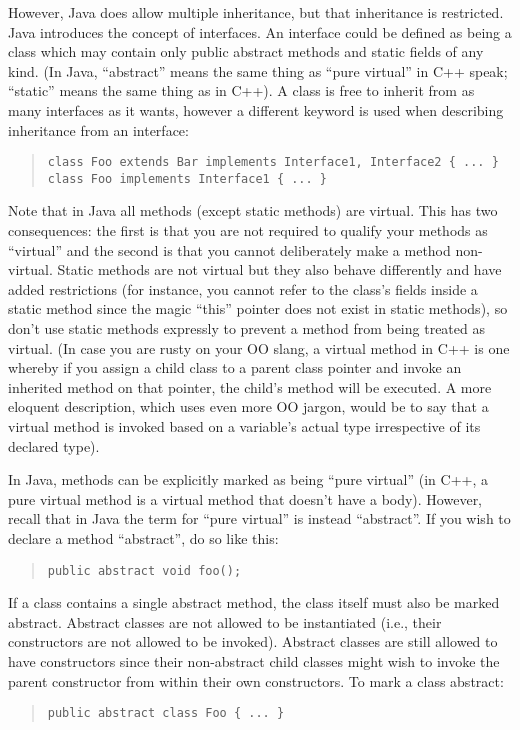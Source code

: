 \documentclass[12pt]{article}
\begin{document}
However, Java does allow multiple inheritance, but that inheritance is
restricted.  Java introduces the concept of interfaces.  An interface
could be defined as being a class which may contain only public
abstract methods and static fields of any kind.  (In Java,
``abstract'' means the same thing as ``pure virtual'' in C++ speak;
``static'' means the same thing as in C++).  A class is free to
inherit from as many interfaces as it wants, however a different
keyword is used when describing inheritance from an interface:
\begin{quote}
\begin{verbatim}
class Foo extends Bar implements Interface1, Interface2 { ... }
class Foo implements Interface1 { ... }
\end{verbatim}
\end{quote}

Note that in Java all methods (except static methods) are virtual.  This
has two consequences: the first is that you are not required to qualify
your methods as ``virtual'' and the second is that you cannot deliberately
make a method non-virtual.  Static methods are not virtual but they also
behave differently and have added restrictions (for instance, you cannot
refer to the class's fields inside a static method since the magic ``this''
pointer does not exist in static methods), so don't use static methods
expressly to prevent a method from being treated as virtual.  (In case you
are rusty on your OO slang, a virtual method in C++ is one whereby if you
assign a child class to a parent class pointer and invoke an inherited
method on that pointer, the child's method will be executed.  A more
eloquent description, which uses even more OO jargon, would be to say that
a virtual method is invoked based on a variable's actual type irrespective
of its declared type).

In Java, methods can be explicitly marked as being ``pure virtual'' (in C++,
a pure virtual method is a virtual method that doesn't have a body).
However, recall that in Java the term for ``pure virtual'' is instead
``abstract''.  If you wish to declare a method ``abstract'', do so like this:
\begin{quote}
\begin{verbatim}
public abstract void foo();
\end{verbatim}
\end{quote}

If a class contains a single abstract method, the class itself must also be
marked abstract.  Abstract classes are not allowed to be instantiated
(i.e., their constructors are not allowed to be invoked).  Abstract classes
are still allowed to have constructors since their non-abstract child
classes might wish to invoke the parent constructor from within their own
constructors.  To mark a class abstract:
\begin{quote}
\begin{verbatim}
public abstract class Foo { ... }
\end{verbatim}
\end{quote}
\end{document}
